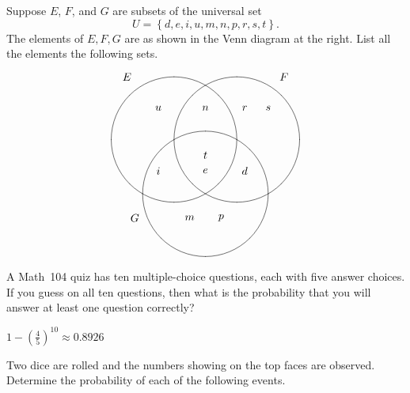 \documentclass[addpoints,12pt]{exam}
\begin{document}
\begin{questions}

\begin{multicols}{2}
\question[10]
Suppose $E$, $F$, and $G$ are subsets
of the universal set \[U=\left\{d,e,i,u,m,n,p,r,s,t\right\}.\]
The elements of
$E,F,G$ are as shown in the Venn diagram
at the right.
List all the elements the following sets.
\[\begin{xy}<1cm,0cm>:
(-2.5,2)*{E};
(2.5,2)*{F};
(-2.25,-2.5)*{G};
(-1,0)*\cir<2cm>{};
(1,0)*\cir<2cm>{};
(0,-1.732)*\cir<2cm>{};
(-1.5,1)*{u};
(-1.5,-1)*{i};
(0,1)*{n};
(0,-.5)*{t};
(0,-1)*{e};
(1.25,1)*{r};
(1.25,-1)*{d};
(2,1)*{s};
(-.5,-2.5)*{m};
(.5,-2.5)*{p};
\end{xy}\]
\end{multicols}

\question[10] A Math~104 quiz has ten multiple-choice
questions, each with five answer choices. If you guess on all
ten questions, then what is the probability that you will answer at
least one question correctly?
\begin{solution}[1in]
$1-\left(\frac{4}{5}\right)^{10}\approx 0.8926$
\end{solution}
\ifprintanswers\else\newpage\fi

\question[16] Two dice are rolled and the
numbers showing on the top faces are observed.
Determine the probability of each of the following events.
\end{questions}
\end{document}

